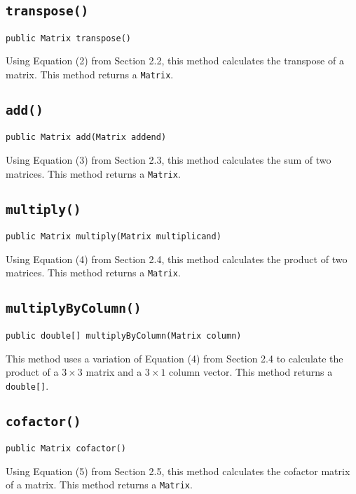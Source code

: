 \documentclass[12pt]{article}
\begin{document}
\subsection{\texttt{transpose()}}
\begin{verbatim}
public Matrix transpose()
\end{verbatim}
Using Equation (2) from Section 2.2, this method calculates the transpose of a matrix. This method returns a \texttt{Matrix}.

\subsection{\texttt{add()}}
\begin{verbatim}
public Matrix add(Matrix addend)
\end{verbatim}
Using Equation (3) from Section 2.3, this method calculates the sum of two matrices. This method returns a \texttt{Matrix}.

\subsection{\texttt{multiply()}}
\begin{verbatim}
public Matrix multiply(Matrix multiplicand)
\end{verbatim}
Using Equation (4) from Section 2.4, this method calculates the product of two matrices. This method returns a \texttt{Matrix}.


\subsection{\texttt{multiplyByColumn()}}
\begin{verbatim}
public double[] multiplyByColumn(Matrix column)
\end{verbatim}
This method uses a variation of Equation (4) from Section 2.4 to calculate the product of a $3\times3$ matrix and a $3\times1$ column vector. This method returns a \texttt{double[]}.

\subsection{\texttt{cofactor()}}
\begin{verbatim}
public Matrix cofactor()
\end{verbatim}
Using Equation (5) from Section 2.5, this method calculates the cofactor matrix of a matrix. This method returns a \texttt{Matrix}.
\end{document}
